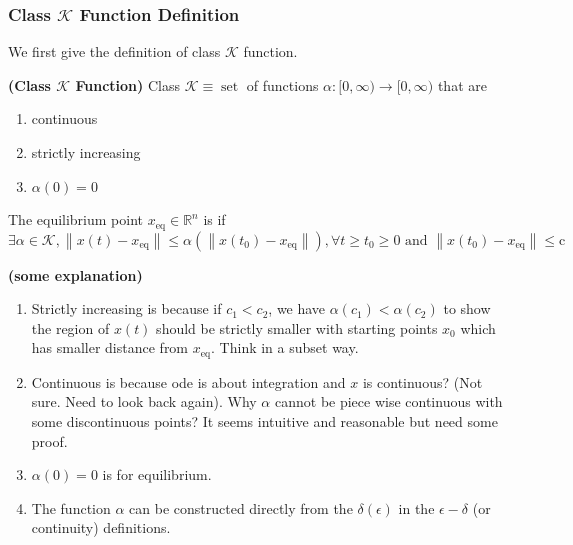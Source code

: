 \documentclass{article}
\newcommand{\bfs}[1]{\textbf{({#1}) }}
\begin{document}
\subsubsection{Class $\mathcal{K}$ Function Definition}
We first give the definition of class $\mathcal{K}$ function.
\begin{defa}\bfs{Class $\mathcal{K}$ Function}
Class $\mathcal{K} \equiv \operatorname{set}$ of functions $\alpha:[0, \infty) \rightarrow[0, \infty)$ that are
\begin{enumerate}
    \item continuous
    \item strictly increasing
    \item $\alpha(0)=0$
\end{enumerate}
\end{defa}
\begin{defa}\label{def:kstable}
The equilibrium point $x_{\mathrm{eq}} \in \mathbb{R}^{n}$ is  if $$\exists \alpha \in \mathcal{K},
\left\|x(t)-x_{\mathrm{eq}}\right\| \leq \alpha\left(\left\|x\left(t_{0}\right)-x_{\mathrm{eq}}\right\|\right), \forall t \geq t_{0} \geq 0\text{ and } \left\|x\left(t_{0}\right)-x_{\mathrm{eq}}\right\| \leq \mathrm{c}$$
\end{defa}
\begin{rema}\bfs{some explanation}
\begin{enumerate}
    \item Strictly increasing is because if $c_1<c_2$, we have $\alpha(c_1)<\alpha(c_2)$ to show the region of $x(t)$ should be strictly smaller with starting points $x_0$ which has smaller distance from $x_{\mathrm{eq}}$. Think in a subset way. 
    \item Continuous is because ode is about integration and $x$ is continuous? (Not sure. Need to look back again). Why $\alpha$ cannot be piece wise continuous with some discontinuous points? It seems intuitive and reasonable but need some proof.
    \item $\alpha(0)=0$ is for equilibrium. 
    \item The function $\alpha$ can be constructed directly from the $\delta(\epsilon)$ in the $\epsilon-\delta$ (or continuity) definitions.
\end{enumerate}
\end{rema}
\end{document}
